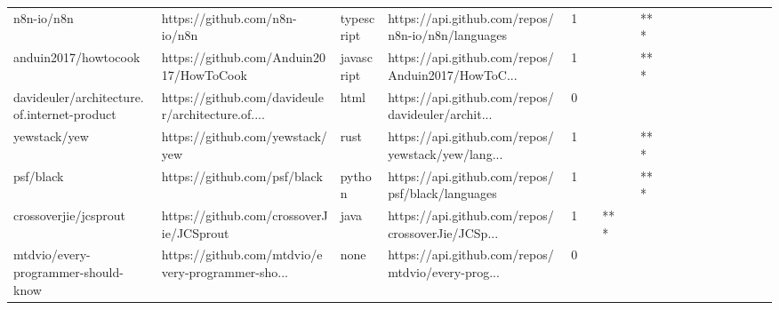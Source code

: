 \begin{tabular}{llllrlllllllllllll}
n8n-io/n8n                                         &                      https://github.com/n8n-io/n8n &        typescript &  https://api.github.com/repos/n8n-io/n8n/languages &       1 &         &        &           &            *** &                 &        &           &           &          &          &       &              &          \\
anduin2017/howtocook                               &            https://github.com/Anduin2017/HowToCook &        javascript &  https://api.github.com/repos/Anduin2017/HowToC... &       1 &         &        &           &            *** &                 &        &           &           &          &          &       &              &          \\
davideuler/architecture.of.internet-product        &  https://github.com/davideuler/architecture.of.... &              html &  https://api.github.com/repos/davideuler/archit... &       0 &         &        &           &                &                 &        &           &           &          &          &       &              &          \\
yewstack/yew                                       &                    https://github.com/yewstack/yew &              rust &  https://api.github.com/repos/yewstack/yew/lang... &       1 &         &        &           &            *** &                 &        &           &           &          &          &       &              &          \\
psf/black                                          &                       https://github.com/psf/black &            python &   https://api.github.com/repos/psf/black/languages &       1 &         &        &           &            *** &                 &        &           &           &          &          &       &              &          \\
crossoverjie/jcsprout                              &           https://github.com/crossoverJie/JCSprout &              java &  https://api.github.com/repos/crossoverJie/JCSp... &       1 &         &    *** &           &                &                 &        &           &           &          &          &       &              &          \\
mtdvio/every-programmer-should-know                &  https://github.com/mtdvio/every-programmer-sho... &              none &  https://api.github.com/repos/mtdvio/every-prog... &       0 &         &        &           &                &                 &        &           &           &          &          &       &              &          \\

\end{tabular}
